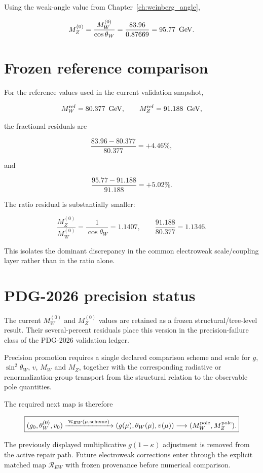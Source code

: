 Using the weak-angle value from Chapter~\ref{ch:weinberg_angle},

\[
M_Z^{(0)} = \frac{M_W^{(0)}}{\cos\theta_W}
          = \frac{83.96}{0.87669}
          = 95.77\ \,\text{GeV}.
\]

\section{Frozen reference comparison}

For the reference values used in the current validation snapshot,

\[
M_W^{\rm ref}=80.377\ \,\text{GeV},
\qquad
M_Z^{\rm ref}=91.188\ \,\text{GeV},
\]

the fractional residuals are

\[
\frac{83.96-80.377}{80.377}=+4.46\%,
\]

and

\[
\frac{95.77-91.188}{91.188}=+5.02\%.
\]

The ratio residual is substantially smaller:

\[
\frac{M_Z^{(0)}}{M_W^{(0)}}
=\frac1{\cos\theta_W}
=1.1407,
\qquad
\frac{91.188}{80.377}=1.1346.
\]

This isolates the dominant discrepancy in the common electroweak scale/coupling
layer rather than in the ratio alone.

\section{PDG-2026 precision status}

The current $M_W^{(0)}$ and $M_Z^{(0)}$ values are retained as a frozen
structural/tree-level result.  Their several-percent residuals place this
version in the precision-failure class of the PDG-2026 validation ledger.

Precision promotion requires a single declared comparison scheme and scale for
$g$, $\sin^2\theta_W$, $v$, $M_W$ and $M_Z$, together with the corresponding
radiative or renormalization-group transport from the structural relation to
the observable pole quantities.

The required next map is therefore

\[
\boxed{
(g_0,\theta_W^{(0)},v_0)
\xrightarrow{\;\mathcal R_{EW}(\mu,\text{scheme})\;}
(g(\mu),\theta_W(\mu),v(\mu))
\longrightarrow
(M_W^{\rm pole},M_Z^{\rm pole}).
}
\]

The previously displayed multiplicative $g(1-\kappa)$ adjustment is removed
from the active repair path.  Future electroweak corrections enter through the
explicit matched map $\mathcal R_{EW}$ with frozen provenance before numerical
comparison.
